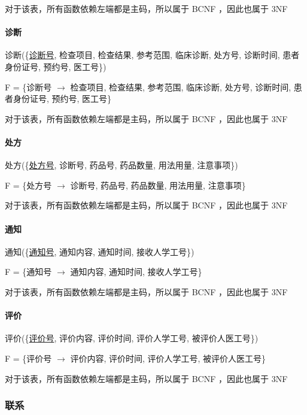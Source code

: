 \documentclass{article}
\begin{document}
对于该表，所有函数依赖左端都是主码，所以属于 BCNF ，因此也属于 3NF

\paragraph{诊断}

诊断(\{\underline{诊断号}, 检查项目, 检查结果, 参考范围, 临床诊断, 处方号, 诊断时间, 患者身份证号, 预约号, 医工号\})

F = \{诊断号 $\rightarrow$ 检查项目, 检查结果, 参考范围, 临床诊断, 处方号, 诊断时间, 患者身份证号, 预约号, 医工号\}

对于该表，所有函数依赖左端都是主码，所以属于 BCNF ，因此也属于 3NF

\paragraph{处方}

处方(\{\underline{处方号}, 诊断号, 药品号, 药品数量, 用法用量, 注意事项\})

F = \{处方号 $\rightarrow$ 诊断号, 药品号, 药品数量, 用法用量, 注意事项\}

对于该表，所有函数依赖左端都是主码，所以属于 BCNF ，因此也属于 3NF

\paragraph{通知}

通知(\{\underline{通知号}, 通知内容, 通知时间, 接收人学工号\})

F = \{通知号 $\rightarrow$ 通知内容, 通知时间, 接收人学工号\}

对于该表，所有函数依赖左端都是主码，所以属于 BCNF ，因此也属于 3NF

\paragraph{评价}

评价(\{\underline{评价号}, 评价内容, 评价时间, 评价人学工号, 被评价人医工号\})

F = \{评价号 $\rightarrow$ 评价内容, 评价时间, 评价人学工号, 被评价人医工号\}

对于该表，所有函数依赖左端都是主码，所以属于 BCNF ，因此也属于 3NF

\subsubsection{联系}
\end{document}
